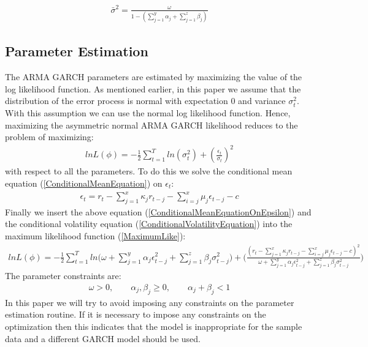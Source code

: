 \begin{align}
    \bar{\sigma}^2=\frac{\omega}{1-(\sum_{j=1}^y\alpha_j+\sum_{j=1}^z\beta_j)} \label{longTermVolatilityGARCH}
\end{align}

\subsection*{Parameter Estimation}

The ARMA GARCH parameters are estimated by maximizing the value of the log likelihood function. As mentioned earlier, in this paper we assume that the distribution of the error process is normal with expectation 0 and variance ${\sigma_t^2}$. With this assumption we can use the normal log likelihood function. Hence, maximizing the asymmetric normal ARMA GARCH likelihood reduces to the problem of maximizing:
\begin{align} 
    ln L(\phi)=-\frac{1}{2}\sum_{t=1}^T ln(\sigma_t^2)+(\frac{\epsilon_t}{\sigma_t})^2  \label{MaximumLike}
\end{align}
with respect to all the parameters. To do this we solve the conditional mean equation (\ref{ConditionalMeanEquation}) on $\epsilon_t$:
\begin{align}
    \epsilon_t=r_t-\sum_{j=1}^x\kappa_j r_{t-j}-\sum_{i=j}^x\mu_j \epsilon_{t-j}-c \label{ConditionalMeanEquationOnEpsilon}
\end{align}
Finally we insert the above equation (\ref{ConditionalMeanEquationOnEpsilon}) and the conditional volatility equation (\ref{ConditionalVolatilityEquation}) into the maximum likelihood function (\ref{MaximumLike}):
\begin{align} 
    ln L(\phi)=-\frac{1}{2}\sum_{t=1}^T ln\Big(\omega + \sum_{j=1}^y\alpha_j\epsilon_{t-j}^2+\sum_{j=1}^z\beta_j\sigma_{t-j}^2\Big)+\Big(\frac{(r_t-\sum_{j=1}^x\kappa_j r_{t-j}-\sum_{i=j}^x\mu_j \epsilon_{t-j}-c)^2}{\omega + \sum_{j=1}^y\alpha_j\epsilon_{t-j}^2+\sum_{j=1}^z\beta_j\sigma_{t-j}^2}\Big)   \label{fullMaximumLike}
\end{align}
The parameter constraints are:
\begin{align} 
    \omega>0,\quad\quad \alpha_j,\beta_j\geq0,\quad\quad \alpha_j+\beta_j<1
\end{align}
In this paper we will try to avoid imposing any constraints on the parameter estimation routine. If it is necessary to impose any constraints on the optimization then this indicates that the model is inappropriate for the sample data and a different GARCH model should be used.

